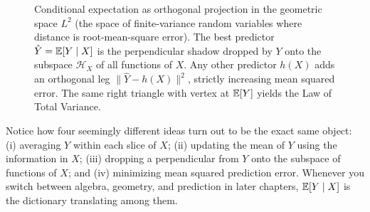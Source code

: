 \begin{figure}[H]
\caption{Conditional expectation as orthogonal projection in the geometric space $L^2$ (the space of finite-variance random variables where distance is root-mean-square error). The best predictor $\hat Y = \operatorname{\mathbb{E}}[Y\mid X]$ is the perpendicular shadow dropped by $Y$ onto the subspace $\mathcal{H}_X$ of all functions of $X$. Any other predictor $h(X)$ adds an orthogonal leg $\|\hat Y - h(X)\|^2$, strictly increasing mean squared error. The same right triangle with vertex at $\operatorname{\mathbb{E}}[Y]$ yields the Law of Total Variance.}
\label{ch15:fig-projection}
\end{figure}

\begin{aestheticbox}
Notice how four seemingly different ideas turn out to be the exact same object: (i) averaging $Y$ within each slice of $X$; (ii) updating the mean of $Y$ using the information in $X$; (iii) dropping a perpendicular from $Y$ onto the subspace of functions of $X$; and (iv) minimizing mean squared prediction error. Whenever you switch between algebra, geometry, and prediction in later chapters, $\operatorname{\mathbb{E}}[Y \mid X]$ is the dictionary translating among them.
\end{aestheticbox}

